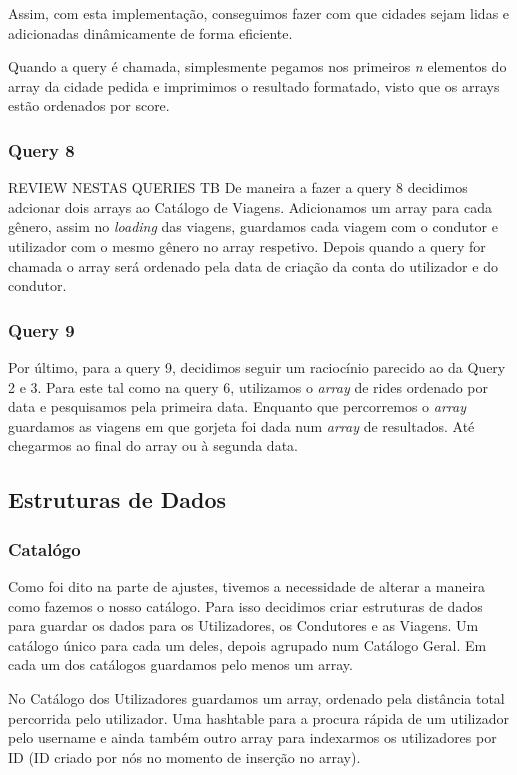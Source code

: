 \documentclass{article}
\begin{document}
            Assim, com esta implementação, conseguimos fazer com que cidades sejam lidas e adicionadas dinâmicamente
            de forma eficiente.

            Quando a query é chamada, simplesmente pegamos nos primeiros \emph{n} elementos do array
            da cidade pedida e imprimimos o resultado formatado, visto que os arrays estão ordenados por score.
        \subsubsection{Query 8}
        REVIEW NESTAS QUERIES TB
            De maneira a fazer a query 8 decidimos adcionar dois arrays ao Catálogo de Viagens. Adicionamos um
            array para cada gênero, assim no \emph{loading} das viagens, guardamos cada viagem com o 
            condutor e utilizador com o mesmo gênero no array respetivo. Depois quando a query for chamada
            o array será ordenado pela data de criação da conta do utilizador e do condutor.
        \subsubsection{Query 9}
            Por último, para a query 9, decidimos seguir um raciocínio parecido ao da Query 2 e 3.
            Para este tal como na query 6, utilizamos o \emph{array} de rides ordenado por data e pesquisamos
            pela primeira data. Enquanto que percorremos o \emph{array} guardamos as viagens em que gorjeta foi
            dada num \emph{array} de resultados. Até chegarmos ao final do array ou à segunda data.
            
    \subsection{Estruturas de Dados}
        \subsubsection{Catalógo}
            Como foi dito na parte de ajustes, tivemos a necessidade de alterar a maneira como fazemos
            o nosso catálogo. Para isso decidimos criar estruturas de dados para guardar os dados para
            os Utilizadores, os Condutores e as Viagens. Um catálogo único para cada um deles, depois
            agrupado num Catálogo Geral.
            Em cada um dos catálogos guardamos pelo menos um array.

            No Catálogo dos Utilizadores guardamos um array, ordenado pela distância total percorrida
            pelo utilizador. Uma hashtable para a procura rápida de um utilizador pelo username e
            ainda também outro array para indexarmos os utilizadores por ID (ID criado por nós no
            momento de inserção no array).
\end{document}
